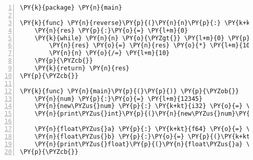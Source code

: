 \begin{Verbatim}[commandchars=\\\{\},numbers=left,firstnumber=1,stepnumber=1]
\PY{k}{package} \PY{n}{main}

\PY{k}{func} \PY{n}{reverse}\PY{p}{(}\PY{n}{n}\PY{p}{:} \PY{k+kt}{i32}\PY{p}{)} \PY{k+kt}{i32} \PY{p}{\PYZob{}}
    \PY{n}{res} \PY{p}{:}\PY{o}{=} \PY{l+m}{0}
    \PY{k}{while} \PY{n}{n} \PY{o}{\PYZgt{}} \PY{l+m}{0} \PY{p}{\PYZob{}}
        \PY{n}{res} \PY{o}{=} \PY{n}{res} \PY{o}{*} \PY{l+m}{10} \PY{o}{+} \PY{n}{n} \PY{o}{\PYZpc{}} \PY{l+m}{10}
        \PY{n}{n} \PY{o}{/=} \PY{l+m}{10}
    \PY{p}{\PYZcb{}}
    \PY{k}{return} \PY{n}{res}
\PY{p}{\PYZcb{}}

\PY{k}{func} \PY{n}{main}\PY{p}{(}\PY{p}{)} \PY{p}{\PYZob{}}
    \PY{n}{num} \PY{p}{:}\PY{o}{=} \PY{l+m}{12345}
    \PY{n}{new\PYZus{}num} \PY{p}{:} \PY{k+kt}{i32} \PY{o}{=} \PY{n}{reverse}\PY{p}{(}\PY{n}{num}\PY{p}{)}
    \PY{n}{print\PYZus{}int}\PY{p}{(}\PY{n}{new\PYZus{}num}\PY{p}{)}

    \PY{n}{float\PYZus{}a} \PY{p}{:} \PY{k+kt}{f64} \PY{o}{=} \PY{p}{(}\PY{k+kt}{f64}\PY{p}{)}\PY{l+m}{1.2}
    \PY{n}{float\PYZus{}b} \PY{p}{:}\PY{o}{=} \PY{p}{(}\PY{k+kt}{f64}\PY{p}{)}\PY{l+m}{3.4}
    \PY{n}{print\PYZus{}float}\PY{p}{(}\PY{n}{float\PYZus{}a} \PY{o}{+} \PY{n}{float\PYZus{}b}\PY{p}{)}
\PY{p}{\PYZcb{}}
\end{Verbatim}
